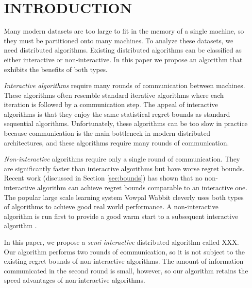 \documentclass[twoside]{article}
\begin{document}



\section{INTRODUCTION}

Many modern datasets are too large to fit in the memory of a single machine,
so they must be partitioned onto many machines.
To analyze these datasets, we need distributed algorithms.
Existing distributed algorithms can be classified as either interactive or non-interactive.
In this paper we propose an algorithm that exhibits the benefits of both types.

\emph{Interactive algorithms} require many rounds of communication between machines.
These algorithms often resemble standard iterative algorithms where each iteration is followed by a communication step.
The appeal of interactive algorithms is that they enjoy the same statistical regret bounds as standard sequential algorithms.
Unfortunately, these algorithms can be too slow in practice because communication is the main bottleneck in modern distributed architectures,
and these algorithms require many rounds of communication.

\emph{Non-interactive} algorithms require only a single round of communication.
They are significantly faster than interactive algorithms
but have worse regret bounds.
Recent work (discussed in Section \ref{sec:bounds}) has shown that no non-interactive algorithm can achieve regret bounds comparable to an interactive one.
The popular large scale learning system Vowpal Wabbit cleverly uses both types of algorithms to achieve good real world performance.
A non-interactive algorithm is run first to provide a good warm start to a subsequent interactive algorithm \citep{vw,agarwal2014reliable}.

In this paper, we propose a \emph{semi-interactive} distributed algorithm called XXX.
Our algorithm performs two rounds of communication,
so it is not subject to the existing regret bounds of non-interactive algorithms.
The amount of information communicated in the second round is small, however,
so our algorithm retains the speed advantages of non-interactive algorithms.
\end{document}
